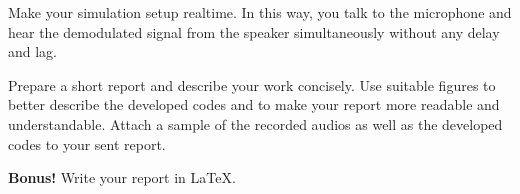\documentclass[11pt]{article}
\begin{document}
\begin{question}
\begin{subquestion}{Make your simulation setup realtime. In this way, you talk to the microphone and hear the demodulated signal from the speaker simultaneously without any delay and lag. 
} 
\end{subquestion}

\begin{subquestion}{Prepare a short report and describe your work concisely. Use suitable figures to better describe the developed codes and to make your report more readable and understandable. Attach a sample of the recorded audios as well as the developed codes to your sent report. 
} 
\end{subquestion}

\begin{subquestion}{\textbf{Bonus!} Write your report in \LaTeX.
} 
\end{subquestion}

\end{question}
\end{document}
